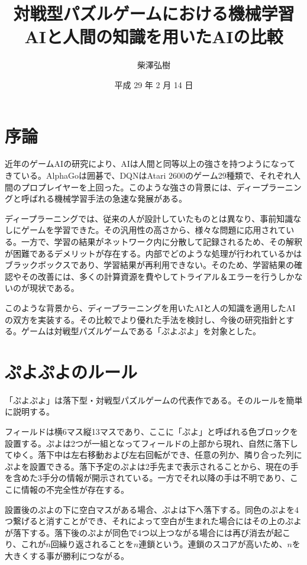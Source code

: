 \documentclass[twocolumn, a4paper]{UECIEresume}
\title{対戦型パズルゲームにおける機械学習AIと人間の知識を用いたAIの比較}
\date{平成 29 年 2 月 14 日}
\affiliation{総合情報学科 メディア情報学 コース}
\author{柴澤弘樹}
\begin{document}
\maketitle

\section{序論}
近年のゲームAIの研究により、AIは人間と同等以上の強さを持つようになってきている。AlphaGo\cite{alphaGo}は囲碁で、DQN\cite{dqn}はAtari 2600のゲーム29種類で、それぞれ人間のプロプレイヤーを上回った。このような強さの背景には、ディープラーニングと呼ばれる機械学習手法の急速な発展がある。

ディープラーニングでは、従来の人が設計していたものとは異なり、事前知識なしにゲームを学習できた。その汎用性の高さから、様々な問題に応用されている。一方で、学習の結果がネットワーク内に分散して記録されるため、その解釈が困難であるデメリットが存在する。内部でどのような処理が行われているかはブラックボックスであり、学習結果が再利用できない。そのため、学習結果の確認やその改善には、多くの計算資源を費やしてトライアル＆エラーを行うしかないのが現状である。


このような背景から、ディープラーニングを用いたAIと人の知識を適用したAIの双方を実装する。その比較でより優れた手法を検討し、今後の研究指針とする。ゲームは対戦型パズルゲームである「ぷよぷよ」を対象とした。


\section{ぷよぷよのルール}
「ぷよぷよ」は落下型・対戦型パズルゲームの代表作である。そのルールを簡単に説明する。

フィールドは横6マス縦13マスであり、ここに「ぷよ」と呼ばれる色ブロックを設置する。ぷよは2つが一組となってフィールドの上部から現れ、自然に落下してゆく。落下中は左右移動および左右回転ができ、任意の列か、隣り合った列にぷよを設置できる。落下予定のぷよは2手先まで表示されることから、現在の手を含めた3手分の情報が開示されている。一方でそれ以降の手は不明であり、ここに情報の不完全性が存在する。

設置後のぷよの下に空白マスがある場合、ぷよは下へ落下する。同色のぷよを4つ繋げると消すことができ、それによって空白が生まれた場合にはその上のぷよが落下する。落下後のぷよが同色で4つ以上つながる場合には再び消去が起こり、これが$n$回繰り返されることを$n$連鎖という。連鎖のスコアが高いため、$n$を大きくする事が勝利につながる。
\end{document}
